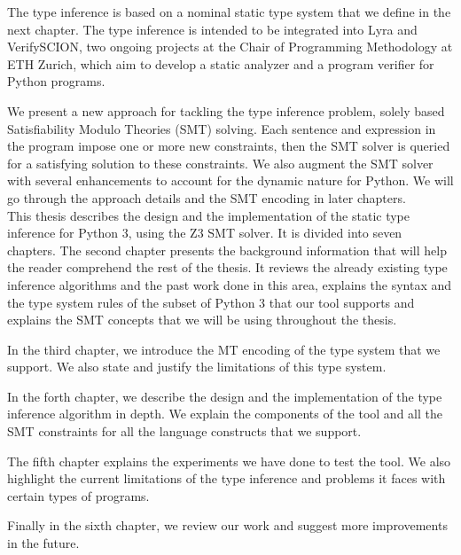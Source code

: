 The type inference is based on a nominal static type system that we define in the next chapter. The type inference is intended to be integrated into Lyra and VerifySCION, two ongoing projects at the Chair of Programming Methodology at ETH Zurich, which aim to develop a static analyzer and a program verifier for Python programs.

We present a new approach for tackling the type inference problem, solely based Satisfiability Modulo Theories (SMT) solving. Each sentence and expression in the program impose one or more new constraints, then the SMT solver is queried for a satisfying solution to these constraints. We also augment the SMT solver with several enhancements to account for the dynamic nature for Python. We will go through the approach details and the SMT encoding in later chapters.\\

This thesis describes the design and the implementation of the static type inference for Python 3, using the Z3 SMT solver. It is divided into seven chapters. The second chapter presents the background information that will help the reader comprehend the rest of the thesis. It reviews the already existing type inference algorithms and the past work done in this area, explains the syntax and the type system rules of the subset of Python 3 that our tool supports and explains the SMT concepts that we will be using throughout the thesis.

In the third chapter, we introduce the MT encoding of the type system that we support. We also state and justify the limitations of this type system.

In the forth chapter, we describe the design and the implementation of the type inference algorithm in depth. We explain the components of the tool and all the SMT constraints for all the language constructs that we support.

The fifth chapter explains the experiments we have done to test the tool. We also highlight the current limitations of the type inference and problems it faces with certain types of programs.

Finally in the sixth chapter, we review our work and suggest more improvements in the future.